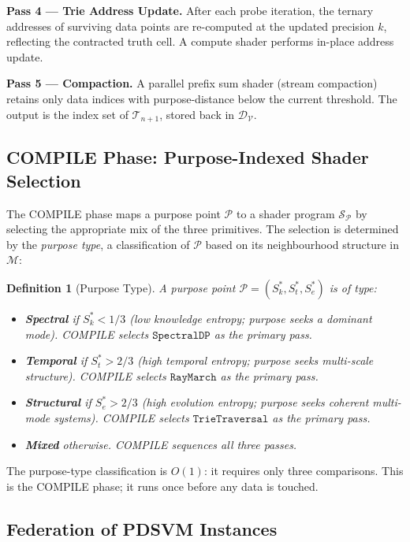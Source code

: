 \documentclass[10pt,twocolumn]{article}
\newtheorem{definition}[theorem]{Definition}
\newcommand{\TruthCell}{\mathcal{T}}
\newcommand{\PurposePoint}{\mathcal{P}}
\newcommand{\DataSpace}{\mathcal{D}}
\newcommand{\ManifoldM}{\mathcal{M}}
\begin{document}
\textbf{Pass 4 --- Trie Address Update.}
After each probe iteration, the ternary addresses of surviving data points
are re-computed at the updated precision $k$, reflecting the contracted
truth cell. A compute shader performs in-place address update.

\textbf{Pass 5 --- Compaction.}
A parallel prefix sum shader (stream compaction) retains only data indices
with purpose-distance below the current threshold.
The output is the index set of $\TruthCell_{n+1}$, stored
back in $\DataSpace_\mathcal{V}$.

\subsection{COMPILE Phase: Purpose-Indexed Shader Selection}

The COMPILE phase maps a purpose point $\PurposePoint$ to a shader program
$\mathcal{S}_\PurposePoint$ by selecting the appropriate mix of the three
primitives. The selection is determined by the \emph{purpose type},
a classification of $\PurposePoint$ based on its neighbourhood structure
in $\ManifoldM$:

\begin{definition}[Purpose Type]
\label{def:purpose-type}
A purpose point $\PurposePoint = (S_k^*, S_t^*, S_e^*)$ is of type:
\begin{itemize}
\item \textbf{Spectral} if $S_k^* < 1/3$ (low knowledge entropy; purpose seeks a dominant mode). COMPILE selects $\mathtt{SpectralDP}$ as the primary pass.
\item \textbf{Temporal} if $S_t^* > 2/3$ (high temporal entropy; purpose seeks multi-scale structure). COMPILE selects $\mathtt{RayMarch}$ as the primary pass.
\item \textbf{Structural} if $S_e^* > 2/3$ (high evolution entropy; purpose seeks coherent multi-mode systems). COMPILE selects $\mathtt{TrieTraversal}$ as the primary pass.
\item \textbf{Mixed} otherwise. COMPILE sequences all three passes.
\end{itemize}
\end{definition}

The purpose-type classification is $O(1)$: it requires only three comparisons.
This is the COMPILE phase; it runs once before any data is touched.

\subsection{Federation of PDSVM Instances}
\end{document}
